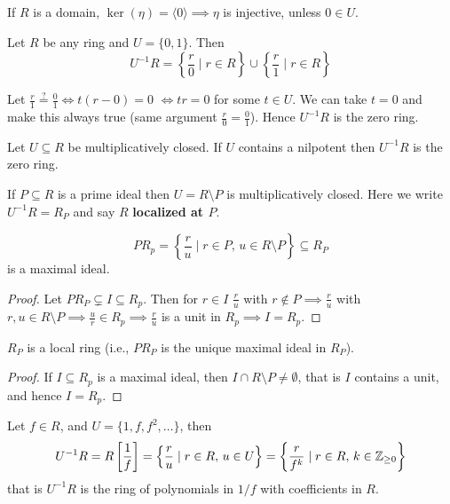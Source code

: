 \documentclass[12pt]{amsart}
\begin{document}
If $R$ is a domain, $\ker(\eta) = \langle 0 \rangle \implies \eta$ is injective, unless $0 \in U$. 

\begin{example} \todo{}
    Let $R$ be any ring and $U = \{0,1\}$. Then 
    \[U^{-1}R = \left\{\frac{r}{0} \mid r \in R\right\} \cup \left\{\frac{r}{1} \mid r \in R\right\} \]

    Let $\frac{r}{1} \overset{?}{=} \frac{0}{1} \iff t(r - 0) = 0$  $\iff tr = 0$ for some $t \in U$. We can take $t = 0$ and make this always true (same argument $\frac{r}{0} = \frac{0}{1}$). Hence $U^{-1}R$ is the zero ring. 
\end{example}

\begin{lemma}
    Let $U \subseteq R$ be multiplicatively closed. If $U$ contains a nilpotent then $U^{-1}R$ is the zero ring. 
\end{lemma}

\begin{definition}
    If $P \subseteq R$ is a prime ideal then $U = R \setminus P$ is multiplicatively closed. Here we write $U^{-1}R = R_P$ and say $R$ \textbf{localized at $P$}. 
\end{definition}

\begin{lemma}
    \[PR_p =\left\{\frac{r}{u} \mid r \in P, \, u \in R \setminus P\right\} \subseteq R_P\] is a maximal ideal.  
\end{lemma}

\begin{proof}
    Let $PR_P \subsetneq I \subseteq R_p$. Then for $r \in I$ $\frac{r}{u}$ with $r \notin P \implies \frac{r}{u}$ with $r, u \in R\setminus P \implies \frac{u}{r} \in R_p \implies \frac{r}{u}$ is a unit in $R_p \implies I = R_p$. \todo{} 
\end{proof}

\begin{proposition}
    $R_P$ is a local ring (i.e., $PR_P$ is the unique maximal ideal in $R_P$). 
\end{proposition}

\begin{proof}
    If $I \subseteq R_p$ is a maximal ideal, then $I \cap R \setminus P \neq \emptyset$, that is $I$ contains a unit, and hence $I = R_p$. 
\end{proof}

\begin{example}
    Let $ f \in R$, and $U =\{1, f, f^2, \ldots\}$, then 
    \[U^{-1}R = R \left[\frac{1}{f}\right] = \left\{ \frac{r}{u} \mid r \in R, \, u \in U\right\} = \left\{ \frac{r}{f^k} \mid r \in R, \, k \in \mathbb Z_{\geq 0}\right\} \] that is $U^{-1}R$ is the ring of polynomials in $1/f$ with coefficients in $R$. 
\end{example}
\end{document}

